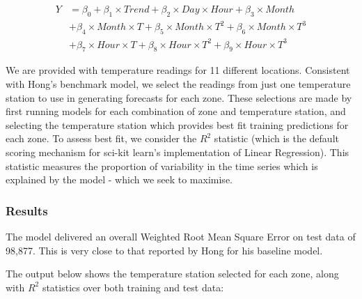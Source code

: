 \documentclass{article} %
\begin{document}
\begin{align*}
Y &= \beta_0 + \beta_1 \times Trend + \beta_2 \times Day \times Hour + \beta_3 \times Month \\
&+ \beta_4 \times Month \times T + \beta_5 \times Month \times T^2 + \beta_6 \times Month \times T^3 \\
&+ \beta_7 \times Hour \times T + \beta_8 \times Hour \times T^2 + \beta_9 \times Hour \times T^3 
\end{align*}

We are provided with temperature readings for 11 different locations.  Consistent with Hong's benchmark model, we select the readings from just one temperature station to use in generating forecasts for each zone.  These selections are made by first running models for each combination of zone and temperature station, and selecting the temperature station which provides best fit training predictions for each zone.  To assess best fit, we consider the $R^2$ statistic (which is the default scoring mechanism for sci-kit learn's implementation of Linear Regression).  This statistic measures the proportion of variability in the time series which is explained by the model - which we seek to maximise.

\subsubsection*{Results}
The model delivered an overall Weighted Root Mean Square Error on test data of 98,877.  This is very close to that reported by Hong for his baseline model.

The output below shows the temperature station selected for each zone, along with $R^2$ statistics over both training and test data:
\end{document}
